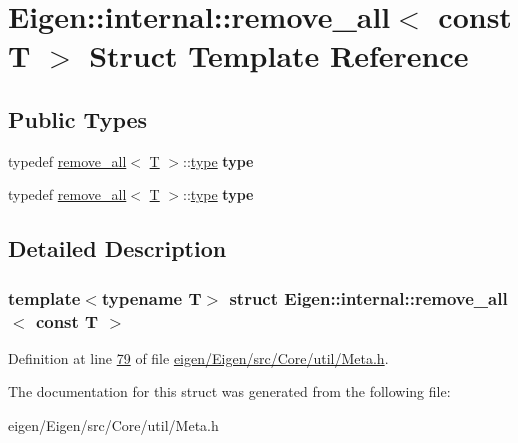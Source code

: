 \hypertarget{struct_eigen_1_1internal_1_1remove__all_3_01const_01_t_01_4}{}\section{Eigen\+:\+:internal\+:\+:remove\+\_\+all$<$ const T $>$ Struct Template Reference}
\label{struct_eigen_1_1internal_1_1remove__all_3_01const_01_t_01_4}
\subsection*{Public Types}
\begin{DoxyCompactItemize}
\item 
\mbox{\label{struct_eigen_1_1internal_1_1remove__all_3_01const_01_t_01_4_ae7e1810cbed71c9b3589fffe082f9ef0}} 
typedef \hyperlink{struct_eigen_1_1internal_1_1remove__all}{remove\+\_\+all}$<$ \hyperlink{group___sparse_core___module}{T} $>$\+::\hyperlink{group___sparse_core___module}{type} {\bfseries type}
\item 
\mbox{\label{struct_eigen_1_1internal_1_1remove__all_3_01const_01_t_01_4_ae7e1810cbed71c9b3589fffe082f9ef0}} 
typedef \hyperlink{struct_eigen_1_1internal_1_1remove__all}{remove\+\_\+all}$<$ \hyperlink{group___sparse_core___module}{T} $>$\+::\hyperlink{group___sparse_core___module}{type} {\bfseries type}
\end{DoxyCompactItemize}


\subsection{Detailed Description}
\subsubsection*{template$<$typename T$>$\newline
struct Eigen\+::internal\+::remove\+\_\+all$<$ const T $>$}



Definition at line \hyperlink{eigen_2_eigen_2src_2_core_2util_2_meta_8h_source_l00079}{79} of file \hyperlink{eigen_2_eigen_2src_2_core_2util_2_meta_8h_source}{eigen/\+Eigen/src/\+Core/util/\+Meta.\+h}.



The documentation for this struct was generated from the following file\+:\begin{DoxyCompactItemize}
\item 
eigen/\+Eigen/src/\+Core/util/\+Meta.\+h\end{DoxyCompactItemize}
